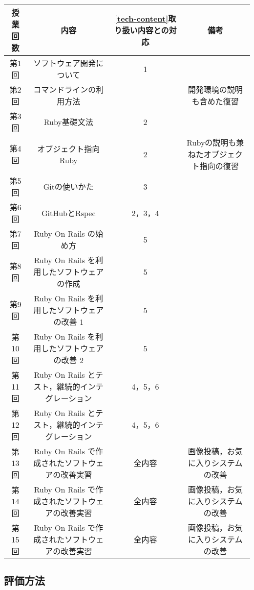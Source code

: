 \begin{table}[ht]
  \begin{center}
    \begin{tabular}{|c|c|c|c|}
      \hline
      授業回数 & 内容 & \ref{tech-content}取り扱い内容との対応 & 備考 \\
      \hline
      第1回 & ソフトウェア開発について & 1 &  \\
      \hline
      第2回 & コマンドラインの利用方法 &  &  開発環境の説明も含めた復習 \\
      \hline
      第3回 & Ruby基礎文法 &  2 &  \\
      \hline
      第4回 & オブジェクト指向Ruby & 2 & Rubyの説明も兼ねたオブジェクト指向の復習 \\
      \hline
      第5回 & Gitの使いかた & 3 & \\
      \hline
      第6回 & GitHubとRspec & 2，3，4 &  \\
      \hline
      第7回 & Ruby On Rails の始め方 & 5 &  \\
      \hline
      第8回 & Ruby On Rails を利用したソフトウェアの作成 & 5 & \\
      \hline
      第9回 & Ruby On Rails を利用したソフトウェアの改善 1 & 5 & \\
      \hline
      第10回 & Ruby On Rails を利用したソフトウェアの改善 2 & 5 & \\
      \hline
      第11回 & Ruby On Rails とテスト，継続的インテグレーション & 4，5，6 & \\
      \hline
      第12回 & Ruby On Rails とテスト，継続的インテグレーション & 4，5，6 & \\
      \hline
      第13回 & Ruby On Rails で作成されたソフトウェアの改善実習 & 全内容 & 画像投稿，お気に入りシステムの改善\\
      \hline
      第14回 & Ruby On Rails で作成されたソフトウェアの改善実習 & 全内容 & 画像投稿，お気に入りシステムの改善\\
      \hline
      第15回 & Ruby On Rails で作成されたソフトウェアの改善実習 & 全内容 & 画像投稿，お気に入りシステムの改善\\
      \hline
    \end{tabular}
  \end{center}
\end{table}

\subsection{評価方法}

